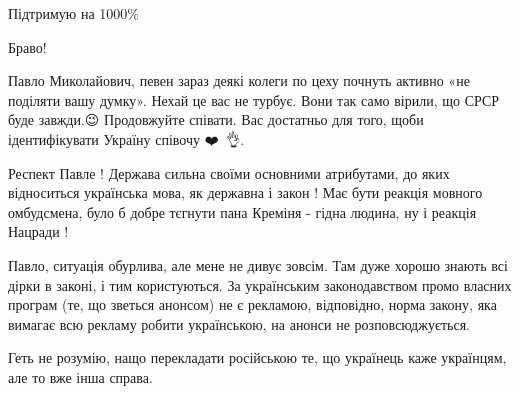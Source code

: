 \begin{itemize}
Підтримую на 1000\%

 
Браво!

 

Павло Миколайович, певен зараз деякі колеги по цеху почнуть активно «не
поділяти вашу думку». Нехай це вас не турбує. Вони так само вірили, що СРСР
буде завжди.😉 Продовжуйте співати. Вас достатньо для того, щоби ідентифікувати
Україну співочу ❤️🙌🚀👌.


 

Респект Павле ! Держава сильна своїми основними атрибутами, до яких відноситься
українська мова, як державна і закон ! Має бути реакція мовного омбудсмена,
було б добре тєгнути пана Креміня - гідна людина, ну і реакція Нацради !

 

Павло, ситуація обурлива, але мене не дивує зовсім. Там дуже хорошо знають всі
дірки в законі, і тим користуються. За українським законодавством промо власних
програм (те, що зветься анонсом) не є рекламою, відповідно, норма закону, яка
вимагає всю рекламу робити українською, на анонси не розповсюджується.

Геть не розумію, нащо перекладати російською те, що українець каже українцям,
але то вже інша справа.

\begin{itemize}
 


\end{itemize}
\end{itemize}
